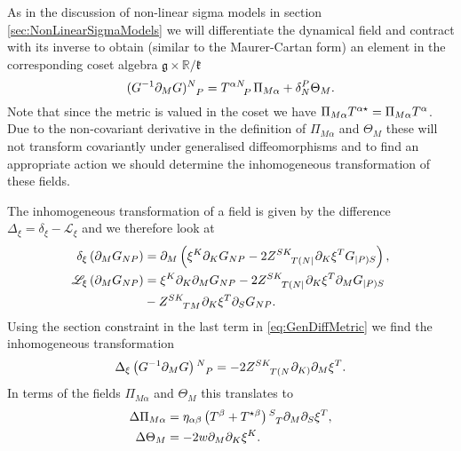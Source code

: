 As in the discussion of non-linear sigma models in section \ref{sec:NonLinearSigmaModels} we will differentiate the dynamical field and contract with its inverse to obtain (similar to the Maurer-Cartan form) an element in the corresponding coset algebra $\mathfrak{g}\times\mathbb{R}/\mathfrak{k}$
\begin{equation}
    (G^{-1}\pd_MG)\tensor{}{^N_P} = \tensor{T}{^{\alpha N}_P}\Pi_{M\alpha}+\delta^P_N\Theta_M.
\end{equation}
Note that since the metric is valued in the coset we have $\Pi_{M\alpha}\tensor{T}{^{\alpha \star}}=\Pi_{M\alpha}\tensor{T}{^{\alpha}}$. Due to the non-covariant derivative in the definition of $\Pi_{M\alpha}$ and $\Theta_M$ these will not transform covariantly under generalised diffeomorphisms and to find an appropriate action we should determine the inhomogeneous transformation of these fields. 

The inhomogeneous transformation of a field is given by the difference $\Delta_\xi = \delta_\xi-\mathscr{L}_\xi$ and we therefore look at 
\begin{align}
    \delta_\xi \left(\pd_MG_{NP}\right) &= \pd_M\left(\xi^K\pd_KG_{NP}-2\tensor{Z}{^{SK}_{T(N|}}\pd_K\xi^TG_{|P)S}\right),\\
    \mathscr{L}_\xi \left(\pd_MG_{NP}\right) &= \xi^K\pd_K\pd_MG_{NP}-2\tensor{Z}{^{SK}_{T(N|}}\pd_K\xi^T\pd_MG_{|P)S}\nonumber\\
        &-\tensor{Z}{^{SK}_{TM}}\pd_K\xi^T\pd_SG_{NP}. \label{eq:GenDiffMetric}
\end{align}
Using the section constraint in the last term in \eqref{eq:GenDiffMetric} we find the inhomogeneous transformation 
\begin{equation}
    \Delta_\xi \left(G^{-1}\pd_MG\right)\tensor{}{^N_P} = -2\tensor{Z}{^{SK}_{T(N}}\pd_{K)}\pd_M\xi^T.
\end{equation}
In terms of the fields $\Pi_{M\alpha}$ and $\Theta_M$ this translates to 
\begin{align}
    \Delta \Pi_{M\alpha} &= \eta_{\alpha\beta}\left(T^\beta+T^{\star\beta}\right)\tensor{}{^S_T}\pd_M\pd_S\xi^T,\\
    \Delta \Theta_M &= -2w\pd_M\pd_K\xi^K.
\end{align}

